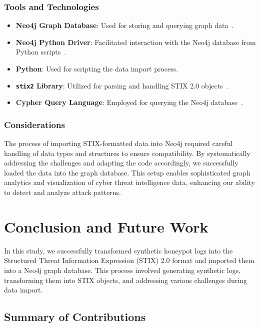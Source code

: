 \documentclass[conference]{IEEEtran}
\begin{document}
\subsubsection{Tools and Technologies}

\begin{itemize}
    \item \textbf{Neo4j Graph Database}: Used for storing and querying graph data~\cite{neo4j}.
    \item \textbf{Neo4j Python Driver}: Facilitated interaction with the Neo4j database from Python scripts~\cite{neo4jpython}.
    \item \textbf{Python}: Used for scripting the data import process.
    \item \textbf{\texttt{stix2} Library}: Utilized for parsing and handling STIX 2.0 objects~\cite{stix2python}.
    \item \textbf{Cypher Query Language}: Employed for querying the Neo4j database~\cite{francis2018cypher}.
\end{itemize}

\subsubsection{Considerations}

The process of importing STIX-formatted data into Neo4j required careful handling of data types and structures to ensure compatibility. By systematically addressing the challenges and adapting the code accordingly, we successfully loaded the data into the graph database. This setup enables sophisticated graph analytics and visualization of cyber threat intelligence data, enhancing our ability to detect and analyze attack patterns.




\section{Conclusion and Future Work}

In this study, we successfully transformed synthetic honeypot logs into the Structured Threat Information Expression (STIX) 2.0 format and imported them into a Neo4j graph database. This process involved generating synthetic logs, transforming them into STIX objects, and addressing various challenges during data import.

\subsection{Summary of Contributions}
\end{document}
